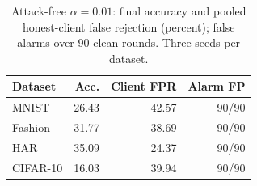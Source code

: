 \begin{table}[!t]
\centering\footnotesize
\caption{Attack-free $\alpha=0.01$: final accuracy and pooled honest-client false rejection (percent); false alarms over 90 clean rounds. Three seeds per dataset.}\label{tab:clean}
\begin{tabular}{lrrr}
\toprule
Dataset & Acc. & Client FPR & Alarm FP \\
\midrule
MNIST & 26.43 & 42.57 & 90/90 \\
Fashion & 31.77 & 38.69 & 90/90 \\
HAR & 35.09 & 24.37 & 90/90 \\
CIFAR-10 & 16.03 & 39.94 & 90/90 \\
\bottomrule
\end{tabular}
\end{table}
